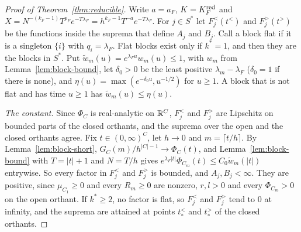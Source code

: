 \begin{proof}[Proof of Theorem~\ref{thm:reducible}]
Write $a=a_F$, $K=K^{\rm red}_F$ and $X=N^{-(k_F-1)}T^{p_F}e^{-T\lambda_F}=h^{k_F-1}T^{-a}e^{-T\lambda_F}$.
For $j\in S^*$ let $F^<_j(t^<)$ and $F^>_j(t^>)$ be the functions inside the suprema that define
$A_j$ and $B_j$. Call a block flat if it is a singleton $\{i\}$ with $q_i=\lambda_F$. Flat
blocks exist only if $k^*=1$, and then they are the blocks in $S^*$. Put
$\tilde w_m(u)=e^{\lambda_Fu}w_m(u)\le1$, with $w_m$ from Lemma~\ref{lem:block-bound}, let
$\delta_0>0$ be the least positive $\lambda_m-\lambda_F$ ($\delta_0=1$ if there is none), and
$\eta(u)=\max(e^{-\delta_0u},u^{-1/2})$ for $u\ge1$. A block that is not flat and has time
$u\ge1$ has $\tilde w_m(u)\le\eta(u)$.

\emph{The constant.} Since $\Phi_C$ is real-analytic on $\mathbb{R}^C$, $F^<_j$ and $F^>_j$ are Lipschitz
on bounded parts of the closed orthants, and the suprema over the open and the closed orthants
agree. Fix $t\in(0,\infty)^C$, let $h\to0$ and $m=\lceil t/h\rceil$. By
Lemma~\ref{lem:block-short}, $G_C(m)/h^{|C|-1}\to\Phi_C(t)$, and Lemma~\ref{lem:block-bound} with
$T=|t|+1$ and $N=T/h$ gives $e^{\lambda_F|t|}\Phi_{C_m}(t)\le C_0\tilde w_m(|t|)$ entrywise. So
every factor in $F^<_j$ and $F^>_j$ is bounded, and $A_j,B_j<\infty$. They are positive, since
$\mu_{C_1}\ge0$ and every $R_m\ge0$ are nonzero, $r,l>0$ and every $\Phi_{C_m}>0$ on the open
orthant. If $k^*\ge2$, no factor is flat, so $F^<_j$ and $F^>_j$ tend to $0$ at infinity, and the
suprema are attained at points $t^<_*$ and $t^>_*$ of the closed orthants.


\end{proof}
